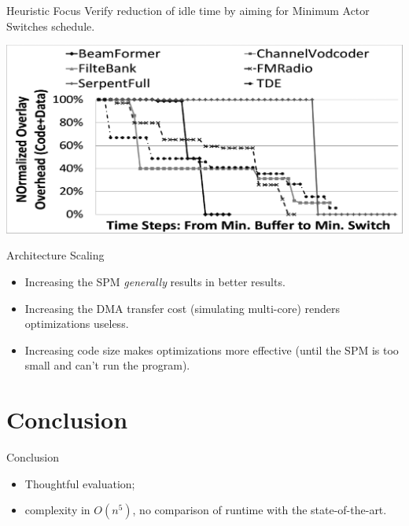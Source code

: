 \documentclass{beamer}
\begin{document}
\begin{frame}{Heuristic Focus}
  Verify reduction of idle time by aiming for Minimum Actor Switches schedule.
  \begin{center}
    \hspace*{-0.05\textwidth}
    \includegraphics[width=1.1\textwidth]{fig15}
  \end{center}
\end{frame}

\begin{frame}{Architecture Scaling}
  \begin{itemize}
    \item Increasing the SPM \textit{generally} results in better results.
    \item Increasing the DMA transfer cost (simulating multi-core) renders optimizations useless.
    \item Increasing code size makes optimizations more effective (until the SPM is too small and can't run the program).
  \end{itemize}
\end{frame}


\section*{Conclusion}

\begin{frame}{Conclusion}
  \begin{itemize}
    \item Thoughtful evaluation;
    \item complexity in $O(n^5)$, no comparison of runtime with the state-of-the-art.
  \end{itemize}
\end{frame}

\appendix
\end{document}
